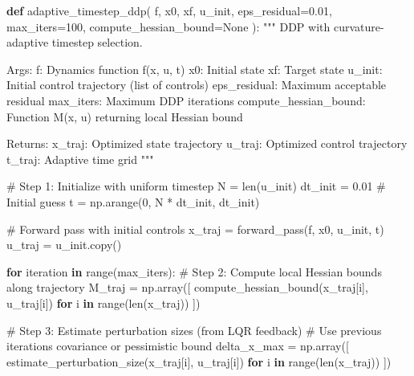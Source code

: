 \documentclass[
  letterpaper,
  DIV=11,
  numbers=noendperiod]{scrartcl}
\newenvironment{Shaded}{\begin{snugshade}}{\end{snugshade}}
\newcommand{\BuiltInTok}[1]{\textcolor[rgb]{0.00,0.23,0.31}{#1}}
\newcommand{\CommentTok}[1]{\textcolor[rgb]{0.37,0.37,0.37}{#1}}
\newcommand{\ControlFlowTok}[1]{\textcolor[rgb]{0.00,0.23,0.31}{\textbf{#1}}}
\newcommand{\DecValTok}[1]{\textcolor[rgb]{0.68,0.00,0.00}{#1}}
\newcommand{\FloatTok}[1]{\textcolor[rgb]{0.68,0.00,0.00}{#1}}
\newcommand{\KeywordTok}[1]{\textcolor[rgb]{0.00,0.23,0.31}{\textbf{#1}}}
\newcommand{\NormalTok}[1]{\textcolor[rgb]{0.00,0.23,0.31}{#1}}
\newcommand{\OperatorTok}[1]{\textcolor[rgb]{0.37,0.37,0.37}{#1}}
\newcommand{\VariableTok}[1]{\textcolor[rgb]{0.07,0.07,0.07}{#1}}
\begin{document}
\begin{Shaded}
\begin{Highlighting}[]
\KeywordTok{def}\NormalTok{ adaptive\_timestep\_ddp(}
\NormalTok{    f, x0, xf, u\_init,}
\NormalTok{    eps\_residual}\OperatorTok{=}\FloatTok{0.01}\NormalTok{,}
\NormalTok{    max\_iters}\OperatorTok{=}\DecValTok{100}\NormalTok{,}
\NormalTok{    compute\_hessian\_bound}\OperatorTok{=}\VariableTok{None}
\NormalTok{):}
    \CommentTok{"""}
\CommentTok{    DDP with curvature{-}adaptive timestep selection.}

\CommentTok{    Args:}
\CommentTok{        f: Dynamics function f(x, u, t)}
\CommentTok{        x0: Initial state}
\CommentTok{        xf: Target state}
\CommentTok{        u\_init: Initial control trajectory (list of controls)}
\CommentTok{        eps\_residual: Maximum acceptable residual}
\CommentTok{        max\_iters: Maximum DDP iterations}
\CommentTok{        compute\_hessian\_bound: Function M(x, u) returning local Hessian bound}

\CommentTok{    Returns:}
\CommentTok{        x\_traj: Optimized state trajectory}
\CommentTok{        u\_traj: Optimized control trajectory}
\CommentTok{        t\_traj: Adaptive time grid}
\CommentTok{    """}

    \CommentTok{\# Step 1: Initialize with uniform timestep}
\NormalTok{    N }\OperatorTok{=} \BuiltInTok{len}\NormalTok{(u\_init)}
\NormalTok{    dt\_init }\OperatorTok{=} \FloatTok{0.01}  \CommentTok{\# Initial guess}
\NormalTok{    t }\OperatorTok{=}\NormalTok{ np.arange(}\DecValTok{0}\NormalTok{, N }\OperatorTok{*}\NormalTok{ dt\_init, dt\_init)}

    \CommentTok{\# Forward pass with initial controls}
\NormalTok{    x\_traj }\OperatorTok{=}\NormalTok{ forward\_pass(f, x0, u\_init, t)}
\NormalTok{    u\_traj }\OperatorTok{=}\NormalTok{ u\_init.copy()}

    \ControlFlowTok{for}\NormalTok{ iteration }\KeywordTok{in} \BuiltInTok{range}\NormalTok{(max\_iters):}
        \CommentTok{\# Step 2: Compute local Hessian bounds along trajectory}
\NormalTok{        M\_traj }\OperatorTok{=}\NormalTok{ np.array([}
\NormalTok{            compute\_hessian\_bound(x\_traj[i], u\_traj[i])}
            \ControlFlowTok{for}\NormalTok{ i }\KeywordTok{in} \BuiltInTok{range}\NormalTok{(}\BuiltInTok{len}\NormalTok{(x\_traj))}
\NormalTok{        ])}

        \CommentTok{\# Step 3: Estimate perturbation sizes (from LQR feedback)}
        \CommentTok{\# Use previous iteration\textquotesingle{}s covariance or pessimistic bound}
\NormalTok{        delta\_x\_max }\OperatorTok{=}\NormalTok{ np.array([}
\NormalTok{            estimate\_perturbation\_size(x\_traj[i], u\_traj[i])}
            \ControlFlowTok{for}\NormalTok{ i }\KeywordTok{in} \BuiltInTok{range}\NormalTok{(}\BuiltInTok{len}\NormalTok{(x\_traj))}
\NormalTok{        ])}


\end{Highlighting}
\end{Shaded}
\end{document}
